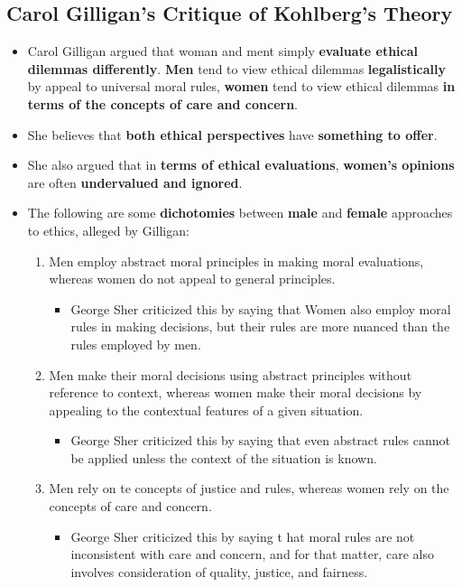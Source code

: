 \documentclass[16pt]{article}
\begin{document}
    \subsection*{Carol Gilligan's Critique of Kohlberg's Theory}
    \begin{itemize}
        \item Carol Gilligan argued that woman and ment simply \textbf{evaluate ethical dilemmas differently}. \textbf{Men} tend to view ethical dilemmas \textbf{legalistically} by appeal to universal moral rules, \textbf{women} tend to view ethical dilemmas \textbf{in terms of the concepts of care and concern}.
        \item She believes that \textbf{both ethical perspectives} have \textbf{something to offer}.
        \item She also argued that in \textbf{terms of ethical evaluations}, \textbf{women's opinions} are often \textbf{undervalued and ignored}.
        \item The following are some \textbf{dichotomies} between \textbf{male} and \textbf{female} approaches to ethics, alleged by Gilligan:
        \begin{enumerate}
            \item Men employ abstract moral principles in making moral evaluations, whereas women do not appeal to general principles.
            \begin{itemize}
                \item George Sher criticized this by saying that Women also employ moral rules in making decisions, but their rules are more nuanced than the rules employed by men.
            \end{itemize}
            \item Men make their moral decisions using abstract principles without reference to context, whereas women make their moral decisions by appealing to the contextual features of a given situation.
            \begin{itemize}
                \item George Sher criticized this by saying that even abstract rules cannot be applied unless the context of the situation is known.
            \end{itemize}
            \item Men rely on te concepts of justice and rules, whereas women rely on the concepts of care and concern.
            \begin{itemize}
                \item George Sher criticized this by saying t hat moral rules are not inconsistent with care and concern, and for that matter, care also involves consideration of quality, justice, and fairness.
            \end{itemize} 
        \end{enumerate}
    \end{itemize}
\end{document}
